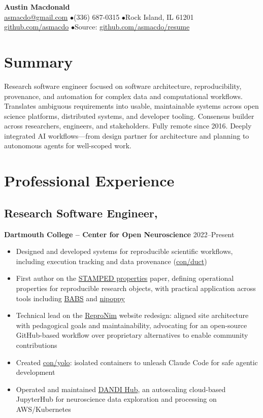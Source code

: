 \documentclass[11pt,letterpaper]{article}
\begin{document}
\begin{center}
  {\LARGE\bfseries Austin Macdonald}\\[0.3em]
  \href{mailto:asmacdo@gmail.com}{asmacdo@gmail.com} \enspace$\bullet$\enspace (336) 687-0315 \enspace$\bullet$\enspace Rock Island, IL 61201\\[0.2em]
  \href{https://github.com/asmacdo}{github.com/asmacdo} \enspace$\bullet$\enspace Source: \href{https://github.com/asmacdo/resume}{github.com/asmacdo/resume}
\end{center}

\section{Summary}

Research software engineer focused on software architecture, reproducibility, provenance, and automation for complex data and computational workflows. Translates ambiguous requirements into usable, maintainable systems across open science platforms, distributed systems, and developer tooling. Consensus builder across researchers, engineers, and stakeholders. Fully remote since 2016. Deeply integrated AI workflows---from design partner for architecture and planning to autonomous agents for well-scoped work.

\section{Professional Experience}

\subsection{Research Software Engineer,} \textbf{Dartmouth College -- Center for Open Neuroscience}
\hfill\textnormal{\small2022--Present}
\begin{itemize}
  \item Designed and developed systems for reproducible scientific workflows, including execution tracking and data provenance (\href{https://github.com/con/duct}{con/duct})
  \item First author on the \href{https://github.com/myyoda/principles-paper}{STAMPED properties} paper, defining operational properties for reproducible research objects, with practical application across tools including \href{https://github.com/PennLINC/babs}{BABS} and \href{https://github.com/nipoppy/nipoppy}{nipoppy}
  \item Technical lead on the \href{https://repronim.org}{ReproNim} website redesign: aligned site architecture with pedagogical goals and maintainability, advocating for an open-source GitHub-based workflow over proprietary alternatives to enable community contributions
  \item Created \href{https://github.com/con/yolo}{con/yolo}: isolated containers to unleash Claude Code for safe agentic development
  \item Operated and maintained \href{https://github.com/dandi/dandi-hub}{DANDI Hub}, an autoscaling cloud-based JupyterHub for neuroscience data exploration and processing on AWS/Kubernetes
\end{itemize}
\end{document}

